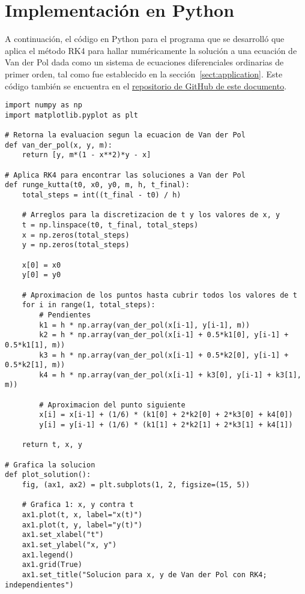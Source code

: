 \section{Implementación en Python}\label{sect:python}

A continuación, el código en Python para el programa que se desarrolló que aplica el método RK4 para hallar numéricamente la solución a una ecuación de Van der Pol dada como un sistema de ecuaciones diferenciales ordinarias de primer orden, tal como fue establecido en la sección~\ref{sect:application}. Este código también se encuentra en el \href{https://github.com/camargomau/runge-kutta}{repositorio de GitHub de este documento}.

\begin{lstlisting}[style=python]
import numpy as np
import matplotlib.pyplot as plt

# Retorna la evaluacion segun la ecuacion de Van der Pol
def van_der_pol(x, y, m):
    return [y, m*(1 - x**2)*y - x]

# Aplica RK4 para encontrar las soluciones a Van der Pol
def runge_kutta(t0, x0, y0, m, h, t_final):
    total_steps = int((t_final - t0) / h)

	# Arreglos para la discretizacion de t y los valores de x, y
    t = np.linspace(t0, t_final, total_steps)
    x = np.zeros(total_steps)
    y = np.zeros(total_steps)

    x[0] = x0
    y[0] = y0

	# Aproximacion de los puntos hasta cubrir todos los valores de t
    for i in range(1, total_steps):
		# Pendientes
        k1 = h * np.array(van_der_pol(x[i-1], y[i-1], m))
        k2 = h * np.array(van_der_pol(x[i-1] + 0.5*k1[0], y[i-1] + 0.5*k1[1], m))
        k3 = h * np.array(van_der_pol(x[i-1] + 0.5*k2[0], y[i-1] + 0.5*k2[1], m))
        k4 = h * np.array(van_der_pol(x[i-1] + k3[0], y[i-1] + k3[1], m))

		# Aproximacion del punto siguiente
        x[i] = x[i-1] + (1/6) * (k1[0] + 2*k2[0] + 2*k3[0] + k4[0])
        y[i] = y[i-1] + (1/6) * (k1[1] + 2*k2[1] + 2*k3[1] + k4[1])

    return t, x, y

# Grafica la solucion
def plot_solution():
    fig, (ax1, ax2) = plt.subplots(1, 2, figsize=(15, 5))

    # Grafica 1: x, y contra t
    ax1.plot(t, x, label="x(t)")
    ax1.plot(t, y, label="y(t)")
    ax1.set_xlabel("t")
    ax1.set_ylabel("x, y")
    ax1.legend()
    ax1.grid(True)
    ax1.set_title("Solucion para x, y de Van der Pol con RK4; independientes")


\end{lstlisting}

